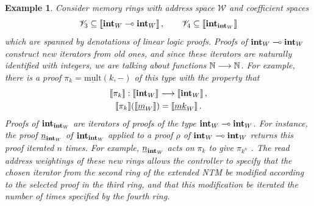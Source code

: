 \documentclass[english,letter paper,12pt,leqno]{article}
\theoremstyle{example}
\newtheorem{example}[theorem]{Example}
\numberwithin{equation}{section}
\begin{document}
\begin{example} Consider memory rings with address space $\mathscr{W}$ and coefficient spaces
\[
\mathscr{V}_3 \subseteq \llbracket  \textbf{int}_{W} \multimap \textbf{int}_W  \rrbracket\,, \qquad \mathscr{V}_4 \subseteq \llbracket  \textbf{int}_{\textbf{int}_W}  \rrbracket
\]
which are spanned by denotations of linear logic proofs. Proofs of $\textbf{int}_W \multimap \textbf{int}_W$ construct new iterators from old ones, and since these iterators are naturally identified with integers, we are talking about functions $\mathbb{N} \longrightarrow \mathbb{N}$. For example, there is a proof $\pi_k = \underline{\mathrm{mult}}(k,-)$ of this type \cite[\S 6.1]{murfet_ll} with the property that
\begin{gather*}
\llbracket \pi_k \rrbracket: \llbracket \textbf{int}_W \rrbracket \longrightarrow \llbracket \textbf{int}_W \rrbracket\,,\\
\llbracket \pi_k \rrbracket( \llbracket \underline{m}_W \rrbracket ) = \llbracket \underline{mk}_W \rrbracket\,.
\end{gather*}
Proofs of $\textbf{int}_{\textbf{int}_W}$ are iterators of proofs of the type $\textbf{int}_W \multimap \textbf{int}_W$. For instance, the proof $\underline{n}_{\textbf{int}_W}$ of $\textbf{int}_{\textbf{int}_W}$ applied to a proof $\rho$ of $\textbf{int}_W \multimap \textbf{int}_W$ returns this proof iterated $n$ times. For example, $\underline{n}_{\textbf{int}_W}$ acts on $\pi_k$ to give $\pi_{k^n}$ \cite[Example 7.4]{murfet_ll}. The read address weightings of these new rings allows the controller to specify that the chosen iterator from the second ring of the extended NTM be modified according to the selected proof in the third ring, and that this modification be iterated the number of times specified by the fourth ring.


\end{example}
\end{document}
